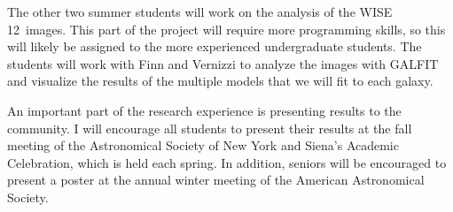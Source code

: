 \documentclass[11pt, preprint]{aastex}
\newcommand{\ha}{H$\alpha$}
\begin{document}
{The other two summer students will work on the analysis of the WISE
12\micron \ images.  This part of the project will require more
programming skills, so this will likely be assigned to the more
experienced undergraduate students.  The students will work with Finn
and Vernizzi to analyze the images with GALFIT and visualize the
results of the multiple models that we will fit to each galaxy.



An important part of the research experience is presenting results
to the community. I will encourage all students 
to present their results at the fall meeting of the 
Astronomical Society of New York and Siena's Academic Celebration, which
is held each spring.  In addition, seniors will be encouraged to
present a poster at the 
annual winter meeting of the American Astronomical Society.  

}
\end{document}
